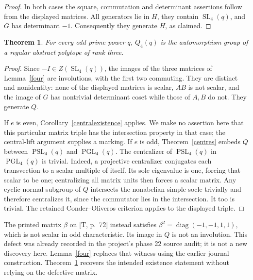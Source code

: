\documentclass[11pt,a4paper]{article}
\newtheorem{theorem}{Theorem}
\newcommand{\SL}{\operatorname{SL}}
\newcommand{\PSL}{\operatorname{PSL}}
\newcommand{\PGL}{\operatorname{PGL}}
\newcommand{\diag}{\operatorname{diag}}
\begin{document}
\begin{proof}
In both cases the square, commutation and determinant assertions
follow from the displayed matrices. All generators lie in $H$,
they contain $\SL_4(q)$, and $G$ has determinant $-1$.
Consequently they generate $H$, as claimed.
\end{proof}

\begin{theorem}\label{qfour}
For every odd prime power $q$, $Q_4(q)$ is the automorphism group
of a regular abstract polytope of rank three.
\end{theorem}
\begin{proof}
Since $-I\in Z(\SL_4(q))$, the images of the three matrices of
Lemma~\ref{four} are involutions, with the first two commuting.
They are distinct and nonidentity: none of the displayed matrices
is scalar, $AB$ is not scalar, and the image of $G$ has nontrivial
determinant coset while those of $A,B$ do not. They generate $Q$.

If $e$ is even, Corollary~\ref{centralexistence} applies. We make
no assertion here that this particular matrix triple has the
intersection property in that case; the central-lift argument
supplies a marking.
If $e$ is odd, Theorem~\ref{centres} embeds $Q$ between
$\PSL_4(q)$ and $\PGL_4(q)$. The centralizer of $\PSL_4(q)$ in
$\PGL_4(q)$ is trivial. Indeed, a projective centralizer conjugates
each transvection to a scalar multiple of itself. Its sole eigenvalue
is one, forcing that scalar to be one; centralizing all matrix units
then forces a scalar matrix. Any cyclic normal subgroup of $Q$
intersects the nonabelian simple socle trivially and therefore
centralizes it, since the commutator lies in the intersection.
It too is trivial. The retained Conder--Oliveros criterion applies
to the displayed triple.
\end{proof}

The printed matrix $\beta$ on [T, p.~72] instead satisfies
$\beta^2=\diag(-1,-1,1,1)$, which is not scalar in odd characteristic.
Its image in $Q$ is not an involution. This defect was already recorded
in the project's phase 22 source audit; it is not a new discovery here.
Lemma~\ref{four} replaces that witness using the earlier journal
construction. Theorem~\ref{qfour} recovers the intended existence
statement without relying on the defective matrix.
\end{document}

